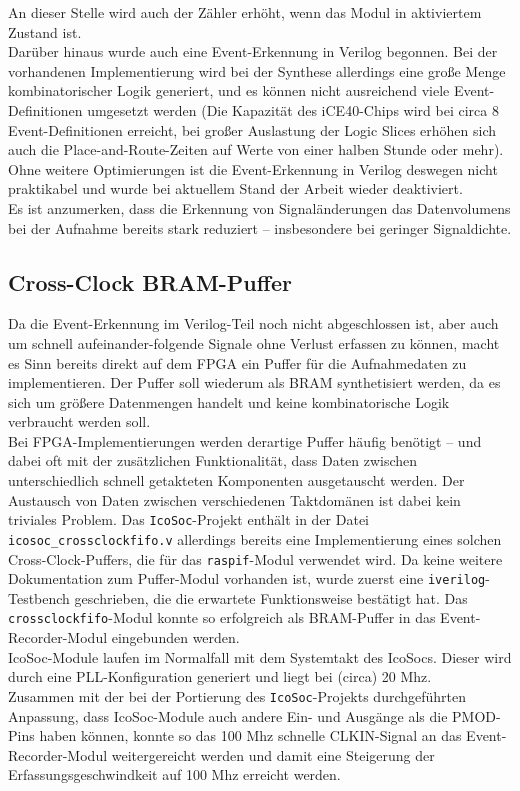 {\begin{verbatim}
\end{verbatim}
An dieser Stelle wird auch der Zähler erhöht, wenn das Modul in aktiviertem Zustand ist.\\
Darüber hinaus wurde auch eine Event-Erkennung in Verilog begonnen. Bei der vorhandenen Implementierung wird bei der Synthese allerdings eine große Menge kombinatorischer Logik generiert, und es können nicht ausreichend viele Event-Definitionen umgesetzt werden (Die Kapazität des iCE40-Chips wird bei circa 8 Event-Definitionen erreicht, bei großer Auslastung der Logic Slices erhöhen sich auch die Place-and-Route-Zeiten auf Werte von einer halben Stunde oder mehr). \\
Ohne weitere Optimierungen ist die Event-Erkennung in Verilog deswegen nicht praktikabel und wurde bei aktuellem Stand der Arbeit wieder deaktiviert.\\
Es ist anzumerken, dass die Erkennung von Signaländerungen das Datenvolumens bei der Aufnahme bereits stark reduziert -- insbesondere bei geringer Signaldichte.

\subsection{Cross-Clock BRAM-Puffer}

Da die Event-Erkennung im Verilog-Teil noch nicht abgeschlossen ist, aber auch um schnell aufeinander-folgende Signale ohne Verlust erfassen zu können, macht es Sinn bereits direkt auf dem FPGA ein Puffer für die Aufnahmedaten zu implementieren. Der Puffer soll wiederum als BRAM synthetisiert werden, da es sich um größere Datenmengen handelt und keine kombinatorische Logik verbraucht werden soll.\\
Bei FPGA-Implementierungen werden derartige Puffer häufig benötigt -- und dabei oft mit der zusätzlichen Funktionalität, dass Daten zwischen unterschiedlich schnell getakteten Komponenten ausgetauscht werden. Der Austausch von Daten zwischen verschiedenen Taktdomänen ist dabei kein triviales Problem. Das {\tt IcoSoc}-Projekt enthält in der Datei {\tt icosoc\_crossclockfifo.v} allerdings bereits eine Implementierung eines solchen Cross-Clock-Puffers, die für das {\tt raspif}-Modul verwendet wird. Da keine weitere Dokumentation zum Puffer-Modul vorhanden ist, wurde zuerst eine {\tt iverilog}-Testbench geschrieben, die die erwartete Funktionsweise bestätigt hat. Das {\tt crossclockfifo}-Modul konnte so erfolgreich als BRAM-Puffer in das Event-Recorder-Modul eingebunden werden.\\
IcoSoc-Module laufen im Normalfall mit dem Systemtakt des IcoSocs. Dieser wird durch eine PLL-Konfiguration generiert und liegt bei (circa) 20 Mhz.\\
Zusammen mit der bei der Portierung des {\tt IcoSoc}-Projekts durchgeführten Anpassung, dass IcoSoc-Module auch andere Ein- und Ausgänge als die PMOD-Pins haben können, konnte so das 100 Mhz schnelle CLKIN-Signal an das Event-Recorder-Modul weitergereicht werden und damit eine Steigerung der Erfassungsgeschwindkeit auf 100 Mhz erreicht werden.  

}
